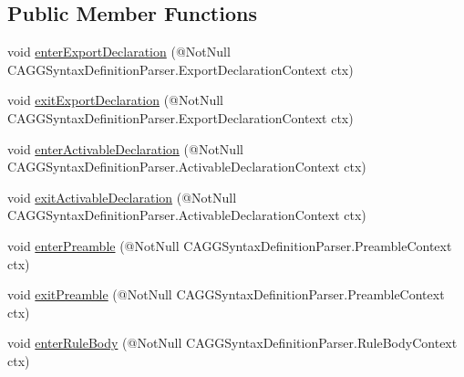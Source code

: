 \subsection*{Public Member Functions}
\begin{DoxyCompactItemize}
\item 
void \hyperlink{interfaceit_1_1emarolab_1_1cagg_1_1core_1_1language_1_1parser_1_1ANTLRInterface_1_1ANTLRGenerate8f089aac366bd2683be460c907cc6185_ad25ced6794894e900e1cbf672b13926f}{enter\-Export\-Declaration} (@Not\-Null C\-A\-G\-G\-Syntax\-Definition\-Parser.\-Export\-Declaration\-Context ctx)
\item 
void \hyperlink{interfaceit_1_1emarolab_1_1cagg_1_1core_1_1language_1_1parser_1_1ANTLRInterface_1_1ANTLRGenerate8f089aac366bd2683be460c907cc6185_a4bbcce968320c168862ae0dcb4875e8e}{exit\-Export\-Declaration} (@Not\-Null C\-A\-G\-G\-Syntax\-Definition\-Parser.\-Export\-Declaration\-Context ctx)
\item 
void \hyperlink{interfaceit_1_1emarolab_1_1cagg_1_1core_1_1language_1_1parser_1_1ANTLRInterface_1_1ANTLRGenerate8f089aac366bd2683be460c907cc6185_a3271ac7a3d33cffaf3f32d055ea85145}{enter\-Activable\-Declaration} (@Not\-Null C\-A\-G\-G\-Syntax\-Definition\-Parser.\-Activable\-Declaration\-Context ctx)
\item 
void \hyperlink{interfaceit_1_1emarolab_1_1cagg_1_1core_1_1language_1_1parser_1_1ANTLRInterface_1_1ANTLRGenerate8f089aac366bd2683be460c907cc6185_a362c9241f0b18f1eec377dfc5148bf07}{exit\-Activable\-Declaration} (@Not\-Null C\-A\-G\-G\-Syntax\-Definition\-Parser.\-Activable\-Declaration\-Context ctx)
\item 
void \hyperlink{interfaceit_1_1emarolab_1_1cagg_1_1core_1_1language_1_1parser_1_1ANTLRInterface_1_1ANTLRGenerate8f089aac366bd2683be460c907cc6185_a9df481d2172132fda17d5cc397bd259e}{enter\-Preamble} (@Not\-Null C\-A\-G\-G\-Syntax\-Definition\-Parser.\-Preamble\-Context ctx)
\item 
void \hyperlink{interfaceit_1_1emarolab_1_1cagg_1_1core_1_1language_1_1parser_1_1ANTLRInterface_1_1ANTLRGenerate8f089aac366bd2683be460c907cc6185_ad59c8a04127ab2a565164f837896e397}{exit\-Preamble} (@Not\-Null C\-A\-G\-G\-Syntax\-Definition\-Parser.\-Preamble\-Context ctx)
\item 
void \hyperlink{interfaceit_1_1emarolab_1_1cagg_1_1core_1_1language_1_1parser_1_1ANTLRInterface_1_1ANTLRGenerate8f089aac366bd2683be460c907cc6185_ab2b0c85ce80c5b65eb7dbb893b787aff}{enter\-Rule\-Body} (@Not\-Null C\-A\-G\-G\-Syntax\-Definition\-Parser.\-Rule\-Body\-Context ctx)

\end{DoxyCompactItemize}
